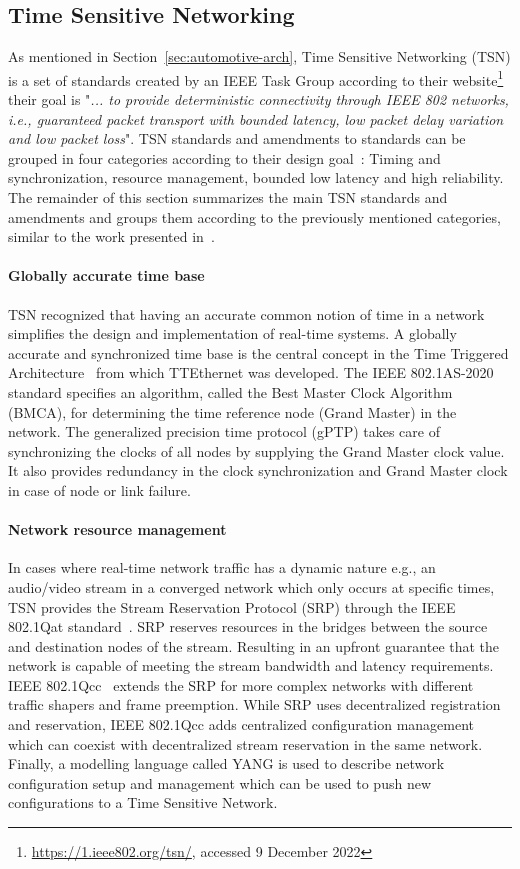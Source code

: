 \subsection{Time Sensitive Networking}
\label{sec:tsn}
As mentioned in Section~\ref{sec:automotive-arch}, Time Sensitive Networking (TSN) is a set of standards created by an IEEE Task Group according to their website\footnote{\url{https://1.ieee802.org/tsn/}, accessed 9 December 2022} their goal is "\textit{... to provide deterministic connectivity through IEEE 802 networks, i.e., guaranteed packet transport with bounded latency, low packet delay variation and low packet loss}". TSN standards and amendments to standards can be grouped in four categories according to their design goal~\cite{ashjaei2021time}: Timing and synchronization, resource management, bounded low latency and high reliability. The remainder of this section summarizes the main TSN standards and amendments and groups them according to the previously mentioned categories, similar to the work presented in~\cite{ashjaei2021time}.

\paragraph{Globally accurate time base}
TSN recognized that having an accurate common notion of time in a network simplifies the design and implementation of real-time systems. A globally accurate and synchronized time base is the central concept in the Time Triggered Architecture~\cite{kopetz2003time} from which TTEthernet was developed. The IEEE 802.1AS-2020~\cite{IEEE8021AS} standard specifies an algorithm, called the Best Master Clock Algorithm (BMCA), for determining the time reference node (Grand Master) in the network. The generalized precision time protocol (gPTP) takes care of synchronizing the clocks of all nodes by supplying the Grand Master clock value. It also provides redundancy in the clock synchronization and Grand Master clock in case of node or link failure.

\paragraph{Network resource management} In cases where real-time network traffic has a dynamic nature e.g., an audio/video stream in a converged network which only occurs at specific times, TSN provides the Stream Reservation Protocol (SRP) through the IEEE 802.1Qat standard~\cite{IEEE8021Qat}. SRP reserves resources in the bridges between the source and destination nodes of the stream. Resulting in an upfront guarantee that the network is capable of meeting the stream bandwidth and latency requirements. IEEE 802.1Qcc~\cite{IEEE8021Qcc} extends the SRP for more complex networks with different traffic shapers and frame preemption. While SRP uses decentralized registration and reservation, IEEE 802.1Qcc adds centralized configuration management which can coexist with decentralized stream reservation in the same network. Finally, a modelling language called YANG is used to describe network configuration setup and management which can be used to push new configurations to a Time Sensitive Network. 

